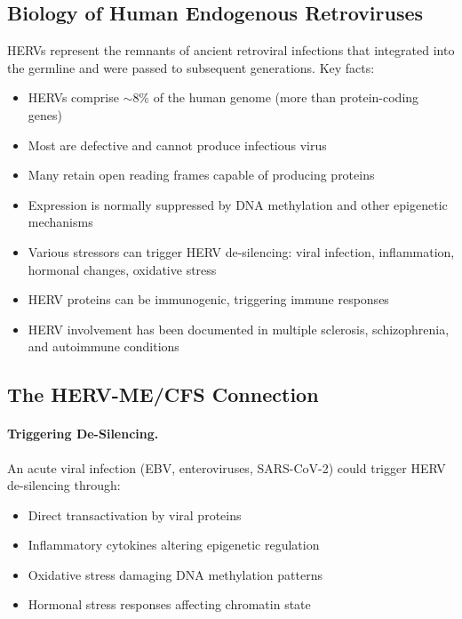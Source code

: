 \subsection{Biology of Human Endogenous Retroviruses}

HERVs represent the remnants of ancient retroviral infections that integrated into the germline and were passed to subsequent generations. Key facts:

\begin{itemize}
    \item HERVs comprise $\sim$8\% of the human genome (more than protein-coding genes)
    \item Most are defective and cannot produce infectious virus
    \item Many retain open reading frames capable of producing proteins
    \item Expression is normally suppressed by DNA methylation and other epigenetic mechanisms
    \item Various stressors can trigger HERV de-silencing: viral infection, inflammation, hormonal changes, oxidative stress
    \item HERV proteins can be immunogenic, triggering immune responses
    \item HERV involvement has been documented in multiple sclerosis, schizophrenia, and autoimmune conditions
\end{itemize}

\subsection{The HERV-ME/CFS Connection}

\paragraph{Triggering De-Silencing.} An acute viral infection (EBV, enteroviruses, SARS-CoV-2) could trigger HERV de-silencing through:
\begin{itemize}
    \item Direct transactivation by viral proteins
    \item Inflammatory cytokines altering epigenetic regulation
    \item Oxidative stress damaging DNA methylation patterns
    \item Hormonal stress responses affecting chromatin state
\end{itemize}

